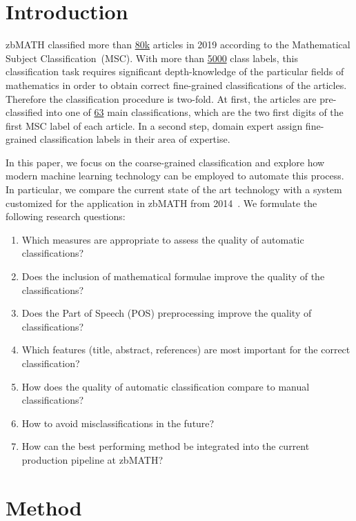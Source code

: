\section{Introduction}\label{sec:intro}
zbMATH classified more than 
\href{https://zbmath.org/?q=%2A+py%3A2019}%
{80k} articles in 2019 according to the Mathematical Subject Classification~(MSC).
With more than
\href{https://msc2020.org}%
{5000} class labels, this classification task requires significant depth-knowledge of the particular fields of mathematics in order to obtain correct fine-grained classifications of the articles.
Therefore the classification procedure is two-fold.
At first, the articles are pre-classified into one of \href{https://msc2020.org}%
{63} main classifications, which are the two first digits of the first MSC label of each article.
In a second step, domain expert assign fine-grained classification labels in their area of expertise.

In this paper, we focus on the coarse-grained classification and explore how modern machine learning technology can be employed to automate this process.
In particular, we compare the current state of the art technology with a system customized for the application in zbMATH from 2014~\cite{SchonebergS14}.
We formulate the following research questions:
\begin{enumerate}
  \item Which measures are appropriate to assess the quality of automatic classifications?
  \item Does the inclusion of mathematical formulae improve the quality of the classifications?
  \item Does the Part of Speech (POS) preprocessing improve the quality of classifications?
  \item Which features (title, abstract, references) are most important for the correct classification?
  \item How does the quality of automatic classification compare to manual classifications?
  \item How to avoid misclassifications in the future?
  \item How can the best performing method be integrated into the current production pipeline at zbMATH?
\end{enumerate}
\section{Method}\label{sec:method}


